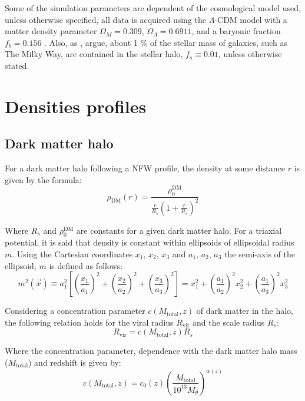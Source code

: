 	Some of the simulation parameters are dependent of the cosmological model used, unless otherwise specified, all data is acquired using the $\Lambda$-CDM model with a matter density parameter $\Omega_M = 0.309$, $\Omega_\Lambda = 0.6911$, and a baryonic fraction $f_b = 0.156$ \cite{choksi2017recoiling}. Also, as \citeauthor{binney2011galactic}, argue, about 1 \% of the stellar mass of galaxies, such as The Milky Way, are contained in the stellar halo, $f_s \equiv 0.01$, unless otherwise stated.
	
	\section{Densities profiles}
		\subsection{Dark matter halo}
			For a dark matter halo following a NFW profile, the density at some distance $r$ is given by the formula:
			\begin{equation}\label{eq: dmdensity}
				\rho_\text{DM}(r) = \dfrac{\rho_0^\text{DM}}{\frac{r}{R_s}\left(1 + \frac{r}{R_s}\right)^2}
			\end{equation}
			
			Where $R_s$ and $\rho_0^\text{DM}$ are constants for a given dark matter halo. For a triaxial potential, it is said that density is constant within ellipsoids of ellipsoidal radius $m$. Using the Cartesian coordinates $x_1$, $x_2$, $x_3$ and $a_1$, $a_2$, $a_3$ the semi-axis of the ellipsoid, $m$ is defined as follows:
			\begin{equation}
				m^2(\vec{x}) \equiv a_1^2\left[\left(\dfrac{x_1}{a_1}\right)^2 + \left(\dfrac{x_2}{a_2}\right)^2 + \left(\dfrac{x_3}{a_3}\right)^2\right] = x_1^2 + \left(\dfrac{a_1}{a_2}\right)^2x_2^2 + \left(\dfrac{a_1}{a_3}\right)^2x_3^2
			\end{equation}
			
			Considering a concentration parameter $c(M_\text{total}, z)$ of dark matter in the halo, the following relation holds for the viral radius $R_\text{vir}$ and the scale radius $R_s$:
			\begin{equation}\label{eq: virialConcentration}
				R_\text{vir} = c(M_\text{total}, z)R_s
			\end{equation}
			
			Where the concentration parameter, dependence with the dark matter halo mass ($M_\text{total}$) and redshift is given by: 
			\begin{equation}
			c(M_\text{total}, z) = c_0(z)\left(\dfrac{M_\text{total}}{10^{13}M_\theta}\right)^{\alpha(z)}
			\end{equation}
			
